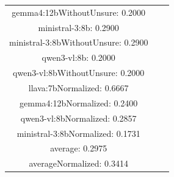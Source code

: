 \documentclass[a4paper]{article}
\begin{document}
\begin{tabular}{ccc}
gemma4:12bWithoutUnsure: 0.2000 \\ ministral-3:8b: 0.2900 \\ ministral-3:8bWithoutUnsure: 0.2900 \\ qwen3-vl:8b: 0.2000 \\ qwen3-vl:8bWithoutUnsure: 0.2000 \\ llava:7bNormalized: 0.6667 \\ gemma4:12bNormalized: 0.2400 \\ qwen3-vl:8bNormalized: 0.2857 \\ ministral-3:8bNormalized: 0.1731 \\ average: 0.2975 \\ averageNormalized: 0.3414 \end{minipage}\\
\end{tabular}

\vspace{5mm}
\end{document}
